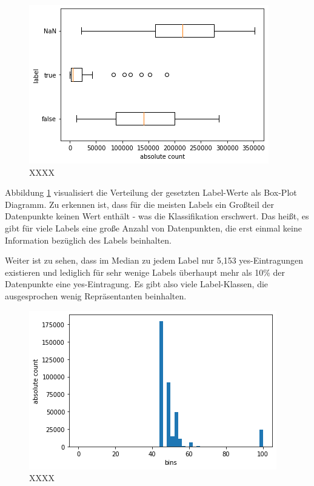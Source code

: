 \documentclass[a4paper,12pt]{scrartcl}
\begin{document}
	\begin{figure}[h]
		\begin{center}
			\includegraphics[scale=.8]{images/boxplot_label.png}
			\caption{XXXX}
			\label{abb:boxplot_label}
		\end{center}		
	\end{figure}	

Abbildung \ref{abb:boxplot_label} visualisiert die Verteilung der gesetzten Label-Werte als Box-Plot Diagramm. Zu erkennen ist, dass für die meisten Labels ein Großteil der Datenpunkte keinen Wert enthält - was die Klassifikation erschwert. Das heißt, es gibt für viele Labels eine große Anzahl von Datenpunkten, die erst einmal keine Information bezüglich des Labels beinhalten.

Weiter ist zu sehen, dass im Median zu jedem Label nur 5,153 yes-Eintragungen existieren und lediglich für sehr wenige Labels überhaupt mehr als 10\% der Datenpunkte eine yes-Eintragung.  Es gibt also viele Label-Klassen, die ausgesprochen wenig Repräsentanten beinhalten. 

\begin{figure}[h]
	\begin{center}
		\includegraphics[scale=.8]{images/hist.png}
		\caption{XXXX}
		\label{abb:histogramm_data}
	\end{center}		
\end{figure}
\end{document}
